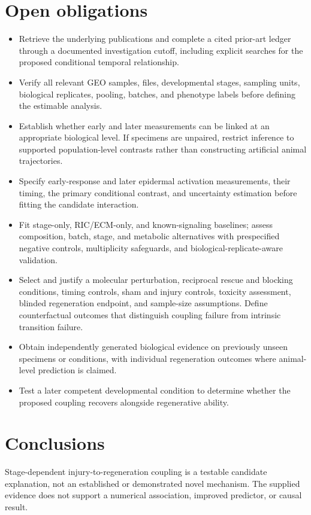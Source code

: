 \documentclass[11pt]{article}
\begin{document}
\section{Open obligations}
\begin{itemize}
\item Retrieve the underlying publications and complete a cited prior-art ledger through a documented investigation cutoff, including explicit searches for the proposed conditional temporal relationship.
\item Verify all relevant GEO samples, files, developmental stages, sampling units, biological replicates, pooling, batches, and phenotype labels before defining the estimable analysis.
\item Establish whether early and later measurements can be linked at an appropriate biological level. If specimens are unpaired, restrict inference to supported population-level contrasts rather than constructing artificial animal trajectories.
\item Specify early-response and later epidermal activation measurements, their timing, the primary conditional contrast, and uncertainty estimation before fitting the candidate interaction.
\item Fit stage-only, RIC/ECM-only, and known-signaling baselines; assess composition, batch, stage, and metabolic alternatives with prespecified negative controls, multiplicity safeguards, and biological-replicate-aware validation.
\item Select and justify a molecular perturbation, reciprocal rescue and blocking conditions, timing controls, sham and injury controls, toxicity assessment, blinded regeneration endpoint, and sample-size assumptions. Define counterfactual outcomes that distinguish coupling failure from intrinsic transition failure.
\item Obtain independently generated biological evidence on previously unseen specimens or conditions, with individual regeneration outcomes where animal-level prediction is claimed.
\item Test a later competent developmental condition to determine whether the proposed coupling recovers alongside regenerative ability.
\end{itemize}
\section{Conclusions}
Stage-dependent injury-to-regeneration coupling is a testable candidate explanation, not an established or demonstrated novel mechanism. The supplied evidence does not support a numerical association, improved predictor, or causal result.
\end{document}
